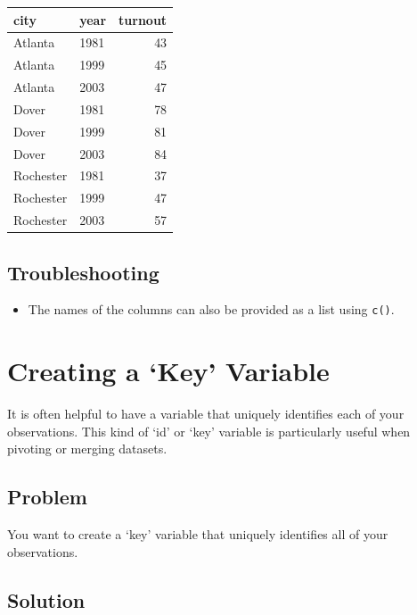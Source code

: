 \documentclass[
]{book}
\providecommand{\tightlist}{%
  \setlength{\itemsep}{0pt}\setlength{\parskip}{0pt}}
\begin{document}
\begin{tabular}{l|l|r}
\hline
city & year & turnout\\
\hline
Atlanta & 1981 & 43\\
\hline
Atlanta & 1999 & 45\\
\hline
Atlanta & 2003 & 47\\
\hline
Dover & 1981 & 78\\
\hline
Dover & 1999 & 81\\
\hline
Dover & 2003 & 84\\
\hline
Rochester & 1981 & 37\\
\hline
Rochester & 1999 & 47\\
\hline
Rochester & 2003 & 57\\
\hline
\end{tabular}

\hypertarget{troubleshooting-23}{%
\subsection{Troubleshooting}\label{troubleshooting-23}}

\begin{itemize}
\tightlist
\item
  The names of the columns can also be provided as a list using \texttt{c()}.
\end{itemize}

\hypertarget{creating-a-key-variable}{%
\section{Creating a `Key' Variable}\label{creating-a-key-variable}}

It is often helpful to have a variable that uniquely identifies each of your observations. This kind of `id' or `key' variable is particularly useful when pivoting or merging datasets.

\hypertarget{problem-27}{%
\subsection{Problem}\label{problem-27}}

You want to create a `key' variable that uniquely identifies all of your observations.

\hypertarget{solution-26}{%
\subsection{Solution}\label{solution-26}}
\end{document}
